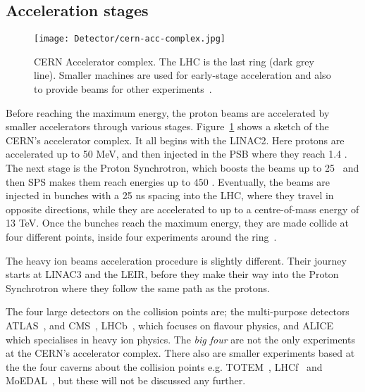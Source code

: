 		\subsection*{Acceleration stages}

			\begin{figure}[!htb]
				\texttt{[image: Detector/cern-acc-complex.jpg]}
				\caption{\ac{CERN} Accelerator complex. The \ac{LHC} is the last ring (dark grey line). Smaller machines are used for early-stage acceleration and also to provide beams for other experiments~\cite{Lefevre2008}.}
				\label{fig:cern-acc-complex}
			\end{figure}

			Before reaching the maximum energy, the proton beams are accelerated by smaller accelerators through various stages. Figure~\ref{fig:cern-acc-complex} shows a sketch of the \ac{CERN}'s accelerator complex. It all begins with the \ac{LINAC2}. Here protons are accelerated up to 50 MeV, and then injected in the \ac{PSB} where they reach 1.4 \GeV. The next stage is the Proton Synchrotron, which boosts the beams up to 25 \GeV\, and then \ac{SPS} makes them reach energies up to $450$ \GeV. Eventually, the beams are injected in bunches with a 25 ns spacing into the \ac{LHC}, where they travel in opposite directions, while they are accelerated to up to a centre-of-mass energy of 13 TeV. Once the bunches reach the maximum energy, they are made collide at four different points, inside four experiments around the ring~\cite{LHCDesignReport}. 

			The heavy ion beams acceleration procedure is slightly different. Their journey starts at \ac{LINAC3} and the \ac{LEIR}, before they make their way into the Proton Synchrotron where they follow the same path as the protons. 

			The four large detectors on the collision points are; the multi-purpose detectors \ac{ATLAS}~\cite{ATLASJINST}, and \ac{CMS}~\cite{CMSJINST}, \ac{LHCb}~\cite{LHCb2008}, which focuses on flavour physics, and \ac{ALICE}~\cite{ALICEJINST} which specialises in heavy ion physics. The \emph{big four} are not the only experiments at the \ac{CERN}'s accelerator complex. There also are smaller experiments based at the the four caverns about the collision points e.g. \ac{TOTEM}~\cite{1748-0221-3-08-S08007}, \ac{LHCf}~\cite{Adriani:926196} and \ac{MoEDAL}~\cite{Pinfold:2017dot}, but these will not be discussed any further.
		


